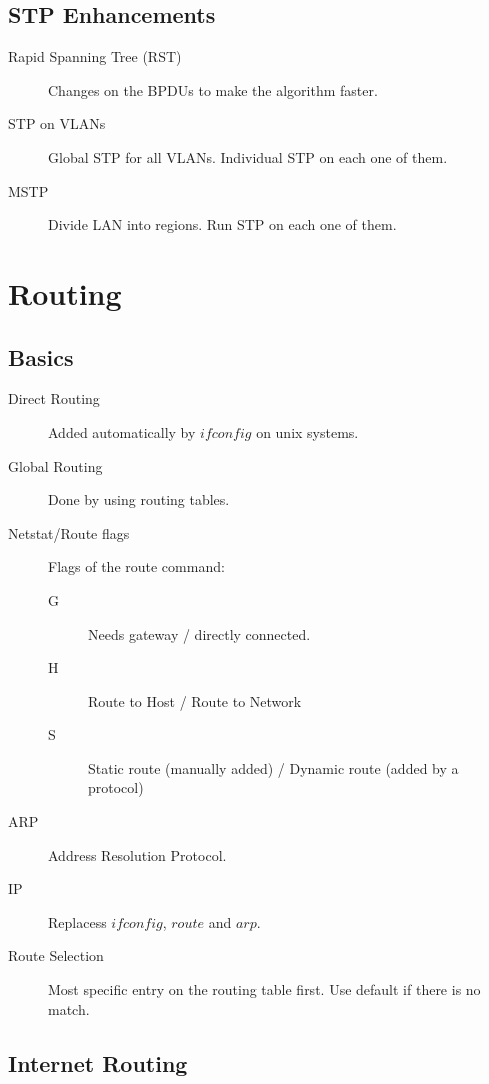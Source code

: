 \documentclass{article}
\begin{document}
\subsection{STP Enhancements}

\begin{description}
   	\item[Rapid Spanning Tree (RST)] Changes on the BPDUs to make the algorithm faster.
   	\item[STP on VLANs] Global STP for all VLANs. Individual STP on each one of them.
   	\item[MSTP] Divide LAN into regions. Run STP on each one of them.
\end{description}




\newpage

\section{Routing}

\subsection{Basics}

\begin{description}
   	\item[Direct Routing] Added automatically by $ifconfig$ on unix systems.
   	\item[Global Routing] Done by using routing tables.
   	\item[Netstat/Route flags] Flags of the route command:
   	\begin{description}
   		\item[G] Needs gateway / directly connected.
   		\item[H] Route to Host / Route to Network
   		\item[S] Static route (manually added) / Dynamic route (added by a protocol)
	\end{description}
   	\item[ARP] Address Resolution Protocol.
   	\item[IP] Replacess $ifconfig$, $route$ and $arp$.
   	\item[Route Selection] Most specific entry on the routing table first. Use default if there is no match.
\end{description}




\subsection{Internet Routing}
\end{document}
